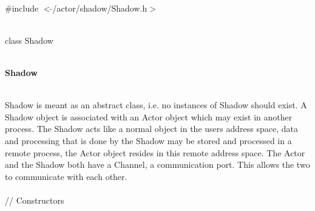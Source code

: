 
   \\
\#include $<\tilde{ }$/actor/shadow/Shadow.h$>$  


  \\
class Shadow 


 \\
{\bf Shadow} 


  \\
\indent Shadow is meant as an abstract class, i.e. no instances of Shadow
should exist. A Shadow object is associated with an Actor object which
may exist in another process. The Shadow acts like a normal object in
the users address space, data and processing that is done by the
Shadow may be stored and processed in a remote process, the Actor object
resides in this remote address space. The Actor and the Shadow both
have a Channel, a communication port. This allows the two to
communicate with each other.\\ 

  \\
// Constructors  

